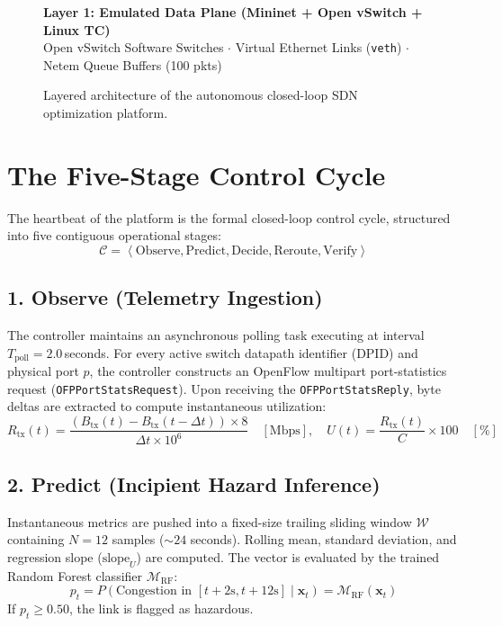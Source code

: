 \begin{figure}[H]
\begin{tcolorbox}[colback=codebg,colframe=sdnnavy,arc=3pt,boxrule=1pt,title=\textbf{End-to-End System Layered Architecture}]
  \begin{tcolorbox}[colback=white,colframe=sdnblue!50,arc=2pt,boxrule=0.6pt,halign=center,top=3pt,bottom=3pt]
    \textbf{\color{sdnnavy}Layer 1: Emulated Data Plane (Mininet \cite{lantz2010network} + Open vSwitch + Linux TC)}\\[1pt]
    \footnotesize Open vSwitch Software Switches $\cdot$ Virtual Ethernet Links (\texttt{veth}) $\cdot$ Netem Queue Buffers (100 pkts)
  \end{tcolorbox}
  \end{tcolorbox}
  \caption{Layered architecture of the autonomous closed-loop SDN optimization platform.}
  \label{fig:arch_block_diagram}
\end{figure}

\section{The Five-Stage Control Cycle}
The heartbeat of the platform is the formal closed-loop control cycle, structured into five contiguous operational stages:
\begin{equation}
  \mathcal{C} = \left\langle \text{Observe}, \text{Predict}, \text{Decide}, \text{Reroute}, \text{Verify} \right\rangle
\end{equation}

\subsection{1. Observe (Telemetry Ingestion)}
The controller maintains an asynchronous polling task executing at interval $T_{\text{poll}} = 2.0$\,seconds. For every active switch datapath identifier (DPID) and physical port $p$, the controller constructs an OpenFlow multipart port-statistics request (\texttt{OFPPortStatsRequest}). Upon receiving the \texttt{OFPPortStatsReply}, byte deltas are extracted to compute instantaneous utilization:
\begin{equation}
  R_{\text{tx}}(t) = \frac{(B_{\text{tx}}(t) - B_{\text{tx}}(t - \Delta t)) \times 8}{\Delta t \times 10^6} \quad [\text{Mbps}], \quad U(t) = \frac{R_{\text{tx}}(t)}{C} \times 100 \quad [\%]
\end{equation}

\subsection{2. Predict (Incipient Hazard Inference)}
Instantaneous metrics are pushed into a fixed-size trailing sliding window $\mathcal{W}$ containing $N=12$ samples ($\sim 24$ seconds). Rolling mean, standard deviation, and regression slope ($\text{slope}_U$) are computed. The vector is evaluated by the trained Random Forest classifier $\mathcal{M}_{\text{RF}}$:
\begin{equation}
  p_t = P(\text{Congestion in } [t + 2\text{s}, t + 12\text{s}] \mid \mathbf{x}_t) = \mathcal{M}_{\text{RF}}(\mathbf{x}_t)
\end{equation}
If $p_t \ge 0.50$, the link is flagged as hazardous.

